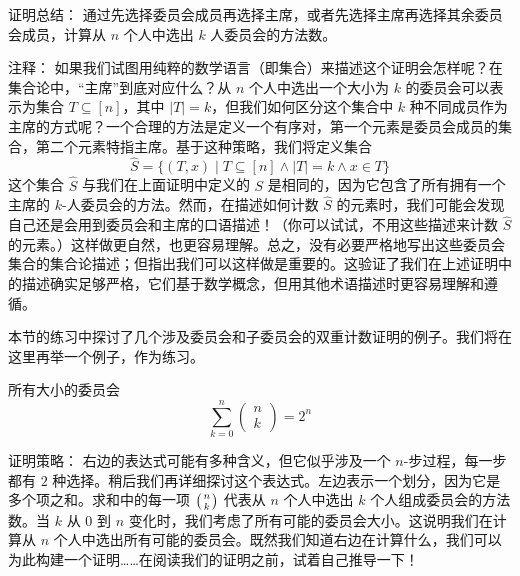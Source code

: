 \begin{questions}{证明总结：}
    通过先选择委员会成员再选择主席，或者先选择主席再选择其余委员会成员，计算从 $n$ 个人中选出 $k$ 人委员会的方法数。
\end{questions}

\begin{questions}{注释：}
    如果我们试图用纯粹的数学语言（即集合）来描述这个证明会怎样呢？在集合论中，``主席''到底对应什么？从 $n$ 个人中选出一个大小为 $k$ 的委员会可以表示为集合 $T \subseteq [n]$，其中 $|T| = k$，但我们如何区分这个集合中 $k$ 种不同成员作为主席的方式呢？一个合理的方法是定义一个有序对，第一个元素是委员会成员的集合，第二个元素特指主席。基于这种策略，我们将定义集合
    \[\hat{S} = \{(T, x) \mid T \subseteq [n] \land |T| = k \land x \in T\}\]
    这个集合 $\hat{S}$ 与我们在上面证明中定义的 $S$ 是相同的，因为它包含了所有拥有一个主席的 $k$-人委员会的方法。然而，在描述如何计数 $\hat{S}$ 的元素时，我们可能会发现自己还是会用到委员会和主席的口语描述！（你可以试试，不用这些描述来计数 $\hat{S}$ 的元素。）这样做更自然，也更容易理解。总之，没有必要严格地写出这些委员会集合的集合论描述；但指出我们可以这样做是重要的。这验证了我们在上述证明中的描述确实足够严格，它们基于数学概念，但用其他术语描述时更容易理解和遵循。

    本节的练习中探讨了几个涉及委员会和子委员会的双重计数证明的例子。我们将在这里再举一个例子，作为练习。
\end{questions}

\begin{proposition}{所有大小的委员会}
    \[\sum_{k=0}^{n} \begin{pmatrix}n\\k\end{pmatrix}=2^n\]
\end{proposition}

\begin{questions}{证明策略：}
    右边的表达式可能有多种含义，但它似乎涉及一个 $n$-步过程，每一步都有 $2$ 种选择。稍后我们再详细探讨这个表达式。左边表示一个划分，因为它是多个项之和。求和中的每一项 $\big({n \atop k}\big)$ 代表从 $n$ 个人中选出 $k$ 个人组成委员会的方法数。当 $k$ 从 $0$ 到 $n$ 变化时，我们考虑了所有可能的委员会大小。这说明我们在计算从 $n$ 个人中选出所有可能的委员会。既然我们知道右边在计算什么，我们可以为此构建一个证明……在阅读我们的证明之前，试着自己推导一下！
\end{questions}

